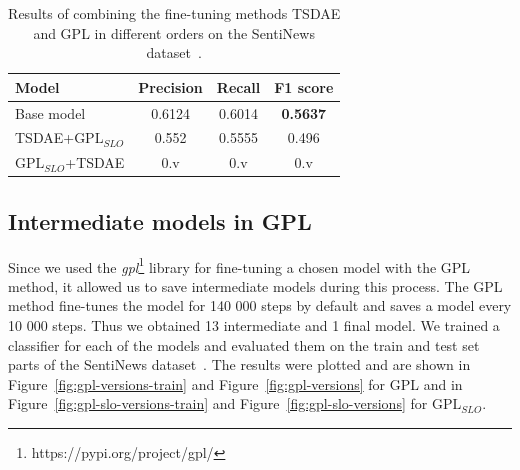 \documentclass[fleqn,moreauthors,10pt]{ds_report}
\begin{document}
\begin{table}[!h]
	\footnotesize
	\begin{center}
		\begin{tabular}{ |l|c|c|c| }
		\hline
		\rowcolor{Blue}Model & Precision & Recall & F1 score\\
		\hline

		Base model & 0.6124 & 0.6014 & \textbf{0.5637}\\
		TSDAE+$\text{GPL}_{SLO}$ & 0.552 & 0.5555 & 0.496\\
		$\text{GPL}_{SLO}$+TSDAE &  0.v & 0.v & 0.v\\

		\hline
		\end{tabular}
	\end{center}
\caption{Results of combining the fine-tuning methods TSDAE and GPL in different orders on the SentiNews dataset~\cite{sentiNews}.}
\label{tab3}
\end{table}


\subsection*{Intermediate models in GPL}
\label{intermediate-paraphrase}
Since we used the \textit{gpl}\footnote{https://pypi.org/project/gpl/} library for fine-tuning a chosen model with the GPL method, it allowed us to save intermediate models during this process. The GPL method fine-tunes the model for 140 000 steps by default and saves a model every 10 000 steps. Thus we obtained 13 intermediate and 1 final model. We trained a classifier for each of the models and evaluated them on the train and test set parts of the SentiNews dataset~\cite{sentiNews}. The results were plotted and are shown in Figure~\ref{fig:gpl-versions-train} and Figure~\ref{fig:gpl-versions} for GPL and in Figure~\ref{fig:gpl-slo-versions-train} and Figure~\ref{fig:gpl-slo-versions} for $\text{GPL}_{SLO}$.
\end{document}
